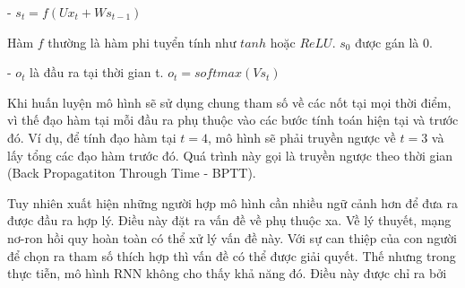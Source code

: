 \documentclass[../main.tex]{subfiles}
\begin{document}
- $s_{t} = f(Ux_{t} + Ws_{t-1})$

Hàm $f$ thường là hàm phi tuyển tính như $tanh$ hoặc $ReLU$. $s_{0}$ được gán là $0$. 

- $o_{t}$ là đầu ra tại thời gian t. $o_{t} = softmax(Vs_{t})$

Khi huấn luyện mô hình sẽ sử dụng chung tham số về các nốt tại mọi thời điểm, vì thế đạo hàm tại mỗi đầu ra phụ thuộc vào các bước tính toán hiện tại và trước đó. Ví dụ, để tính đạo hàm tại $t = 4$, mô hình sẽ phải truyền ngược về $t = 3$ và lấy tổng các đạo hàm trước đó. Quá trình này gọi là truyền ngược theo thời gian (Back Propagatiton Through Time - BPTT).

Tuy nhiên xuất hiện những người hợp mô hình cần nhiều ngữ cảnh hơn để đưa ra được đầu ra hợp lý. Điều này đặt ra vấn đề về phụ thuộc xa. Về lý thuyết, mạng nơ-ron hồi quy hoàn toàn có thể xử lý vấn đề này. Với sự can thiệp của con người để chọn ra tham số thích hợp thì vấn đề có thể được giải quyết. Thế nhưng trong thực tiễn, mô hình RNN không cho thấy khả năng đó. Điều này được chỉ ra bởi\cite{bengio1994learning}
\end{document}
